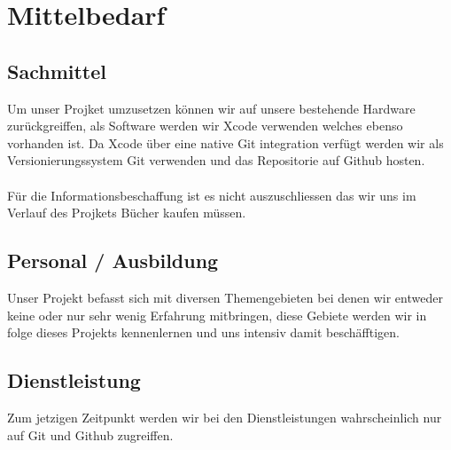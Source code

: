 \documentclass{scrartcl}
\begin{document}
	
	\section{Mittelbedarf}
	
	\subsection{Sachmittel}
	
	Um unser Projket umzusetzen können wir auf unsere bestehende Hardware zurückgreiffen, als Software werden wir Xcode verwenden welches ebenso vorhanden ist. 
	Da Xcode über eine native Git integration verfügt werden wir als Versionierungssystem Git verwenden und das Repositorie auf Github hosten. 
	\\ \\
	Für die Informationsbeschaffung ist es nicht auszuschliessen das wir uns im Verlauf des Projkets Bücher kaufen müssen. 
	
	\subsection{Personal / Ausbildung}
	
	Unser Projekt befasst sich mit diversen Themengebieten bei denen wir entweder keine oder nur sehr wenig Erfahrung mitbringen, diese Gebiete werden wir in folge dieses Projekts kennenlernen und uns intensiv damit beschäfftigen. 
	
	\subsection{Dienstleistung}
	Zum jetzigen Zeitpunkt werden wir bei den Dienstleistungen wahrscheinlich nur auf Git und Github zugreiffen.
	
\end{document}
